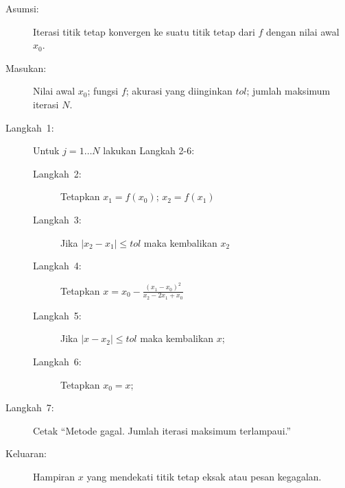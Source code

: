 \begin{pseudocode} 
\begin{description}
\item [{Asumsi:}] Iterasi titik tetap konvergen ke suatu titik tetap dari
$f$ dengan nilai awal $x_{0}$.
\item [{Masukan:}] Nilai awal $x_{0}$; fungsi $f$; akurasi yang diinginkan
$tol$; jumlah maksimum iterasi $N$.
\item [{Langkah~1:}] Untuk $j=1\ldots N$ lakukan Langkah 2-6:

\begin{description}
\item [{Langkah~2:}] Tetapkan $x_{1}=f(x_{0})$; $x_{2}=f(x_{1})$
\item [{Langkah~3:}] Jika $|x_{2}-x_{1}|\leq tol$ maka kembalikan $x_{2}$
\item [{Langkah~4:}] Tetapkan $x=x_{0}-\frac{(x_{1}-x_{0})^{2}}{x_{2}-2x_{1}+x_{0}}$
\item [{Langkah~5:}] Jika $|x-x_{2}|\leq tol$ maka kembalikan $x$;
\item [{Langkah~6:}] Tetapkan $x_{0}=x$;
\end{description}
\item [{Langkah~7:}] Cetak ``Metode gagal. Jumlah iterasi maksimum terlampaui.''
\item [{Keluaran:}] Hampiran $x$ yang mendekati titik tetap eksak atau
pesan kegagalan.
\end{description}
\end{pseudocode}  

